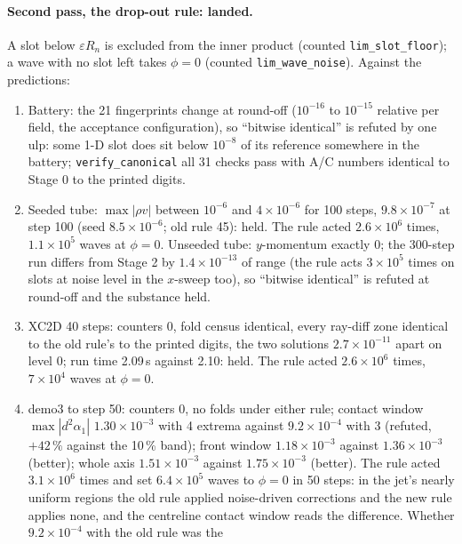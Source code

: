 \documentclass[11pt,a4paper]{article}
\newcommand{\code}[1]{\texttt{\small #1}}
\begin{document}
\paragraph{Second pass, the drop-out rule: landed.}  A slot below
$\varepsilon R_n$ is excluded from the inner product (counted
\code{lim\_slot\_floor}); a wave with no slot left takes $\phi = 0$
(counted \code{lim\_wave\_noise}).  Against the predictions:
\begin{enumerate}[nosep]
\item Battery: the 21 fingerprints change at round-off ($10^{-16}$ to
      $10^{-15}$ relative per field, the acceptance configuration), so
      ``bitwise identical'' is refuted by one ulp: some 1-D slot does sit
      below $10^{-8}$ of its reference somewhere in the battery;
      \code{verify\_canonical} all 31 checks pass with A/C numbers
      identical to Stage 0 to the printed digits.
\item Seeded tube: $\max|\rho v|$ between $10^{-6}$ and $4\times10^{-6}$
      for 100 steps, $9.8\times10^{-7}$ at step 100 (seed
      $8.5\times10^{-6}$; old rule 45): held.  The rule acted
      $2.6\times10^{6}$ times, $1.1\times10^{5}$ waves at $\phi = 0$.
      Unseeded tube: $y$-momentum exactly 0; the 300-step run differs from
      Stage 2 by $1.4\times10^{-13}$ of range (the rule acts $3\times10^{5}$
      times on slots at noise level in the $x$-sweep too), so ``bitwise
      identical'' is refuted at round-off and the substance held.
\item XC2D 40 steps: counters 0, fold census identical, every ray-diff
      zone identical to the old rule's to the printed digits, the two
      solutions $2.7\times10^{-11}$ apart on level 0; run time 2.09\,s
      against 2.10: held.  The rule acted $2.6\times10^{6}$ times,
      $7\times10^{4}$ waves at $\phi = 0$.
\item demo3 to step 50: counters 0, no folds under either rule; contact
      window $\max|d^2\alpha_1|$ $1.30\times10^{-3}$ with 4 extrema against
      $9.2\times10^{-4}$ with 3 (refuted, $+42\,\%$ against the 10\,\% band);
      front window $1.18\times10^{-3}$ against $1.36\times10^{-3}$ (better);
      whole axis $1.51\times10^{-3}$ against $1.75\times10^{-3}$ (better).
      The rule acted $3.1\times10^{6}$ times and set $6.4\times10^{5}$
      waves to $\phi = 0$ in 50 steps: in the jet's nearly uniform regions
      the old rule applied noise-driven corrections and the new rule
      applies none, and the centreline contact window reads the
      difference.  Whether $9.2\times10^{-4}$ with the old rule was the

\end{enumerate}
\end{document}
